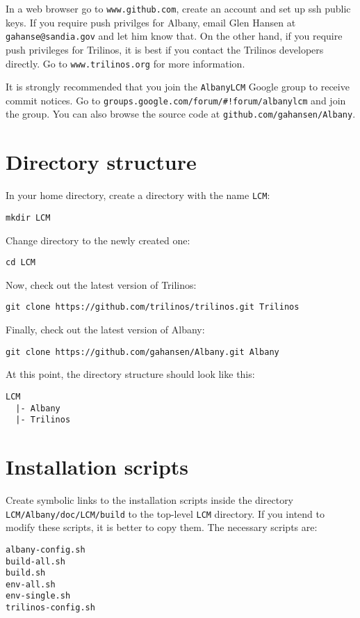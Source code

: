 \documentclass[10pt,a4paper]{article} \usepackage[utf8]{inputenc}
\begin{document}
In a web browser go to \verb+www.github.com+, create an account and
set up ssh public keys. If you require push privilges for Albany,
email Glen Hansen at \verb+gahanse@sandia.gov+ and let him know
that. On the other hand, if you require push privileges for Trilinos,
it is best if you contact the Trilinos developers directly. Go to
\verb+www.trilinos.org+ for more information.

It is strongly recommended that you join the \verb+AlbanyLCM+ Google
group to receive commit notices. Go to
\verb+groups.google.com/forum/#!forum/albanylcm+ and join the
group. You can also browse the source code at
\verb+github.com/gahansen/Albany+.

\section{Directory structure}
In your home directory, create a directory with the name \verb+LCM+:
\begin{verbatim}
mkdir LCM
\end{verbatim}

Change directory to the newly created one:
\begin{verbatim}
cd LCM
\end{verbatim}

Now, check out the latest version of Trilinos:
\begin{verbatim}
git clone https://github.com/trilinos/trilinos.git Trilinos
\end{verbatim}

Finally, check out the latest version of Albany:
\begin{verbatim}
git clone https://github.com/gahansen/Albany.git Albany
\end{verbatim}

At this point, the directory structure should look like this:
\begin{verbatim}
LCM
  |- Albany
  |- Trilinos
\end{verbatim}

\section{Installation scripts}
Create symbolic links to the installation scripts inside the directory
\verb+LCM/Albany/doc/LCM/build+ to the top-level \verb+LCM+ directory. If you
intend to modify these scripts, it is better to copy them. The necessary scripts
are:
\begin{verbatim}
albany-config.sh
build-all.sh
build.sh
env-all.sh
env-single.sh
trilinos-config.sh
\end{verbatim}
\end{document}
